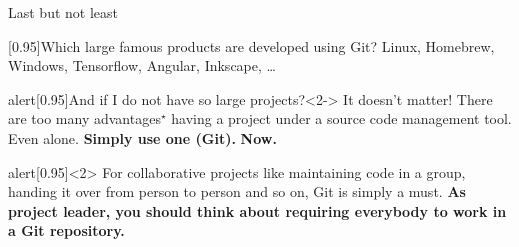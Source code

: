 \documentclass[usenames,svgnames,14pt]{beamer}
\begin{document}
\begin{frame}{Last but not least}
    \vspace{0.05\textheight}
    \begin{varblock}{}[0.95\textwidth]{Which large famous products are developed using Git?}
        Linux, Homebrew, Windows, Tensorflow, Angular, Inkscape, \ldots
    \end{varblock}
    \begin{varblock}{alert}[0.95\textwidth]{And if I do not have so large projects?}<2->
        It doesn't matter!
        There are too many advantages$^\star$ having a project under a source code management tool.
        Even alone.
        \textbf{Simply use one (Git).}
        \alert{\textbf{Now.}}
    \end{varblock}
    \vspace{-0.02\textheight}
    \begin{varblock}{alert}[0.95\textwidth]{}<2>
        \small
        For collaborative projects like maintaining code in a group, handing it over from person to person and so on, Git is simply a must.
        \textbf{As project leader, you should think about requiring everybody to work in a Git repository.}
    \end{varblock}
\end{frame}

\end{document}
